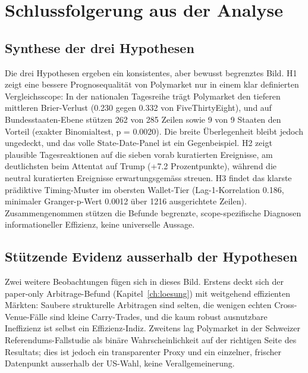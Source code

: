 \chapter{Schlussfolgerung aus der Analyse}
\label{ch:schluss}

\section{Synthese der drei Hypothesen}
Die drei Hypothesen ergeben ein konsistentes, aber bewusst begrenztes Bild. H1
zeigt eine bessere Prognosequalität von Polymarket nur in einem klar definierten
Vergleichsscope: In der nationalen Tagesreihe trägt Polymarket den tieferen
mittleren Brier-Verlust (0.230 gegen 0.332 von FiveThirtyEight), und auf
Bundesstaaten-Ebene stützen 262 von 285 Zeilen sowie 9 von 9 Staaten den Vorteil
(exakter Binomialtest, p = 0.0020). Die breite Überlegenheit bleibt jedoch
ungedeckt, und das volle State-Date-Panel ist ein Gegenbeispiel. H2 zeigt plausible
Tagesreaktionen auf die sieben vorab kuratierten Ereignisse, am deutlichsten beim
Attentat auf Trump (+7.2 Prozentpunkte), während die neutral kuratierten Ereignisse
erwartungsgemäss streuen. H3 findet das klarste prädiktive Timing-Muster im
obersten Wallet-Tier (Lag-1-Korrelation 0.186, minimaler Granger-p-Wert 0.0012 über
1216 ausgerichtete Zeilen). Zusammengenommen stützen die Befunde begrenzte,
scope-spezifische Diagnosen informationeller Effizienz, keine universelle Aussage.

\section{Stützende Evidenz ausserhalb der Hypothesen}
Zwei weitere Beobachtungen fügen sich in dieses Bild. Erstens deckt sich der
paper-only Arbitrage-Befund (Kapitel~\ref{ch:loesung}) mit weitgehend effizienten
Märkten: Saubere strukturelle Arbitragen sind selten, die wenigen echten
Cross-Venue-Fälle sind kleine Carry-Trades, und die kaum robust ausnutzbare
Ineffizienz ist selbst ein Effizienz-Indiz. Zweitens lag Polymarket in der
Schweizer Referendums-Fallstudie als binäre Wahrscheinlichkeit auf der richtigen
Seite des Resultats; dies ist jedoch ein transparenter Proxy und ein einzelner,
frischer Datenpunkt ausserhalb der US-Wahl, keine Verallgemeinerung.

